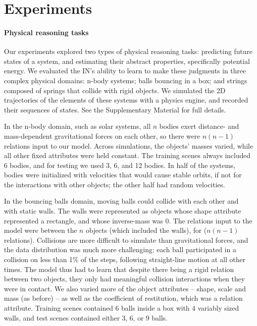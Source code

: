 \documentclass{article}
\begin{document}
\section{Experiments}
\paragraph{Physical reasoning tasks}

Our experiments explored two types of physical reasoning tasks:
predicting future states of a system, and estimating their abstract
properties, specifically potential energy. We evaluated the IN's
ability to learn to make these judgments in three complex physical
domains: n-body systems; balls bouncing in a box; and strings composed
of springs that collide with rigid objects. We simulated the 2D
trajectories of the elements of these systems with a physics engine,
and recorded their sequences of states. See the Supplementary Material
for full details.

In the n-body domain, such as solar systems, all $n$ bodies exert
distance- and mass-dependent gravitational forces on each other, so
there were $n(n-1)$ relations input to our model. Across simulations,
the objects' masses varied, while all other fixed attributes were held
constant. The training scenes always included 6 bodies, and for
testing we used 3, 6, and 12 bodies. In half of the systems, bodies
were initialized with velocities that would cause stable orbits, if
not for the interactions with other objects; the other half had random
velocities.

In the bouncing balls domain, moving balls could collide with each
other and with static walls. The walls were represented as objects
whose shape attribute represented a rectangle, and whose inverse-mass
was 0. The relations input to the model were between the $n$ objects
(which included the walls), for ($n(n-1)$ relations). Collisions are
more difficult to simulate than gravitational forces, and the data
distribution was much more challenging: each ball participated in a
collision on less than 1\% of the steps, following straight-line
motion at all other times. The model thus had to learn that despite
there being a rigid relation between two objects, they only had
meaningful collision interactions when they were in contact. We also
varied more of the object attributes -- shape, scale and mass (as
before) -- as well as the coefficient of restitution, which was a
relation attribute. Training scenes contained 6 balls inside a box
with 4 variably sized walls, and test scenes contained either 3, 6, or
9 balls.
\end{document}
